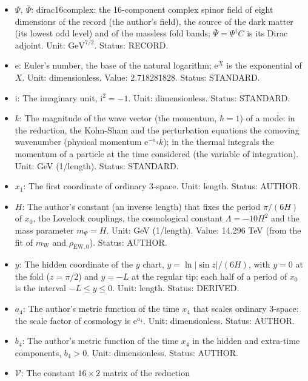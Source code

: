 \documentclass[
  10pt,
]{article}
\providecommand{\tightlist}{%
  \setlength{\itemsep}{0pt}\setlength{\parskip}{0pt}}
\begin{document}
\begin{itemize}
\tightlist
\item
  \(\Psi,\ \bar\Psi\): dirac16complex: the 16-component complex spinor
  field of eight dimensions of the record (the author's field), the
  source of the dark matter (its lowest odd level) and of the massless
  fold bands; \(\bar\Psi = \Psi^\dagger C\) is its Dirac adjoint. Unit:
  \(\mathrm{GeV}^{7/2}\). Status: RECORD.
\item
  \(\mathrm{e}\): Euler's number, the base of the natural logarithm;
  \(\mathrm{e}^{X}\) is the exponential of \(X\). Unit: dimensionless.
  Value: 2.718281828. Status: STANDARD.
\item
  \(\mathrm{i}\): The imaginary unit, \(\mathrm{i}^2 = -1\). Unit:
  dimensionless. Status: STANDARD.
\item
  \(k\): The magnitude of the wave vector (the momentum, \(\hbar = 1\))
  of a mode: in the reduction, the Kohn-Sham and the perturbation
  equations the comoving wavenumber (physical momentum
  \(\mathrm{e}^{-a_4}k\)); in the thermal integrals the momentum of a
  particle at the time considered (the variable of integration). Unit:
  GeV (1/length). Status: STANDARD.
\item
  \(x_1\): The first coordinate of ordinary 3-space. Unit: length.
  Status: AUTHOR.
\item
  \(H\): The author's constant (an inverse length) that fixes the period
  \(\pi/(6H)\) of \(x_0\), the Lovelock couplings, the cosmological
  constant \(\Lambda = -10H^2\) and the mass parameter \(m_\Psi = H\).
  Unit: GeV (1/length). Value: 14.296 TeV (from the fit of
  \(m_{\mathrm{W}}\) and \(\rho_{\mathrm{EW},0}\)). Status: AUTHOR.
\item
  \(y\): The hidden coordinate of the \(y\) chart,
  \(y = \ln\lvert\sin z\rvert/(6H)\), with \(y = 0\) at the fold
  (\(z = \pi/2\)) and \(y = -L\) at the regular tip; each half of a
  period of \(x_0\) is the interval \(-L \le y \le 0\). Unit: length.
  Status: DERIVED.
\item
  \(a_4\): The author's metric function of the time \(x_4\) that scales
  ordinary 3-space: the scale factor of cosmology is
  \(\mathrm{e}^{a_4}\). Unit: dimensionless. Status: AUTHOR.
\item
  \(b_4\): The author's metric function of the time \(x_4\) in the
  hidden and extra-time components, \(b_4 > 0\). Unit: dimensionless.
  Status: AUTHOR.
\item
  \(\mathcal{V}\): The constant \(16 \times 2\) matrix of the reduction

\end{itemize}
\end{document}
